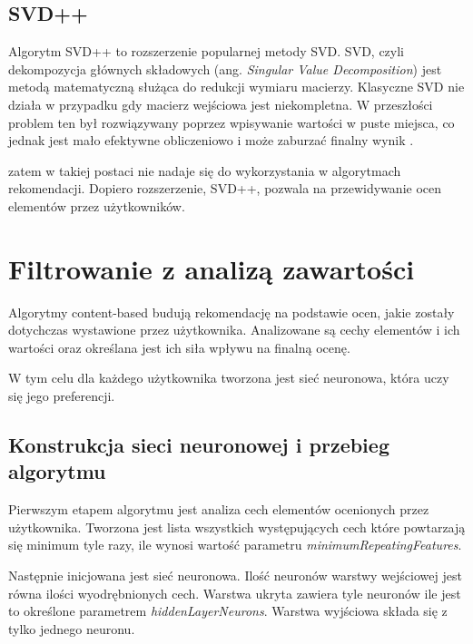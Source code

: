 \documentclass[twoside]{iisthesis}
\begin{document}
		 \subsection{SVD++}
		 
		 
		 Algorytm SVD++ to rozszerzenie popularnej metody SVD. SVD, czyli dekompozycja głównych składowych (ang. \textit{Singular Value Decomposition}) jest metodą matematyczną służąca do redukcji wymiaru macierzy. Klasyczne SVD nie działa w przypadku gdy macierz wejściowa jest niekompletna. W przeszłości problem ten był rozwiązywany poprzez wpisywanie wartości w puste miejsca, co jednak jest mało efektywne obliczeniowo i może zaburzać finalny wynik \cite{sarwar2000application}\cite{koren2009matrix}.  
		  
		  zatem w takiej postaci nie nadaje się do wykorzystania w algorytmach rekomendacji. Dopiero rozszerzenie, SVD++, pozwala na przewidywanie ocen elementów przez użytkowników. 
		 
		 
		 
	 \section{Filtrowanie z analizą zawartości}
	 
		 Algorytmy content-based budują rekomendację na podstawie ocen, jakie zostały dotychczas wystawione przez użytkownika. Analizowane są cechy elementów i ich wartości oraz określana jest ich siła wpływu na finalną ocenę. 
		 
		 W tym celu dla każdego użytkownika tworzona jest sieć neuronowa, która uczy się jego preferencji.
	 
		 \subsection{Konstrukcja sieci neuronowej i przebieg algorytmu}
		 
		 Pierwszym etapem algorytmu jest analiza cech elementów ocenionych przez użytkownika. Tworzona jest lista wszystkich występujących cech które powtarzają się minimum tyle razy, ile wynosi wartość  parametru \textit{minimumRepeatingFeatures}. 
		 
		 Następnie inicjowana jest sieć neuronowa. Ilość neuronów warstwy wejściowej jest równa ilości wyodrębnionych cech. Warstwa ukryta zawiera tyle neuronów ile jest to określone parametrem \textit{hiddenLayerNeurons}. Warstwa wyjściowa składa się z tylko jednego neuronu. 
		 
\end{document}
